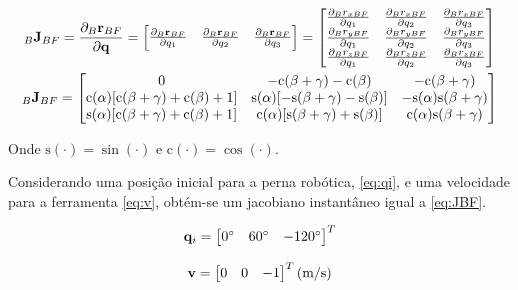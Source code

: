 \begin{gather}\label{eq:J_BF_inB}
	_B \mathbf{J}_{BF} = \frac{\partial _B \mathbf{r}_{BF}}{\partial \mathbf{q}} = \begin{bmatrix}
		\frac{\partial _B \mathbf{r}_{BF}}{\partial q_1} & \frac{\partial_B \mathbf{r}_{BF}}{\partial q_2} & \frac{\partial _B \mathbf{r}_{BF}}{\partial q_3}\end{bmatrix} = \begin{bmatrix}
		\frac{\partial _B r_{xBF}}{\partial q_1} & \frac{\partial_B r_{xBF}}{\partial q_2} & \frac{\partial _B r_{xBF}}{\partial q_3} \\
		\frac{\partial _B r_{yBF}}{\partial q_1} & \frac{\partial_B r_{yBF}}{\partial q_2} & \frac{\partial _B r_{yBF}}{\partial q_3} \\
		\frac{\partial _B r_{zBF}}{\partial q_1} & \frac{\partial_B r_{zBF}}{\partial q_2} & \frac{\partial _B r_{zBF}}{\partial q_3} 
	\end{bmatrix} \\
	_B \mathbf{J}_{BF} = \begin{bmatrix}
	0	& -\text{c}(\beta + \gamma) - \text{c}(\beta)  & -\text{c}(\beta + \gamma) \\
	\text{c}(\alpha)[\text{c}(\beta + \gamma) + \text{c}(\beta) + 1]	& \text{s}(\alpha)[-\text{s}(\beta + \gamma) -\text{s}(\beta)] & -\text{s}(\alpha)\text{s}(\beta + \gamma) \\
	\text{s}(\alpha)[\text{c}(\beta + \gamma) + \text{c}(\beta) + 1]	&  \text{c}(\alpha)[\text{s}(\beta + \gamma) +\text{s}(\beta)] & \text{c}(\alpha)\text{s}(\beta + \gamma)
	\end{bmatrix}
\end{gather}

Onde $\text{s}(\cdot) = \sin(\cdot)$ e $\text{c}(\cdot) = \cos(\cdot)$.

Considerando uma posição inicial para a perna robótica, \eqref{eq:qi}, e uma velocidade para a ferramenta \eqref{eq:v}, obtém-se um jacobiano instantâneo igual a \eqref{eq:JBF}.

\begin{equation}\label{eq:qi}
	\mathbf{q}_i = \begin{bmatrix}
		0^\circ & 60^\circ & -120^\circ
	\end{bmatrix}^T
\end{equation}

\begin{equation}\label{eq:v}
	\mathbf{v} = \begin{bmatrix}
		0 & 0 & -1\end{bmatrix}^T \text{(m/s)}
\end{equation}

